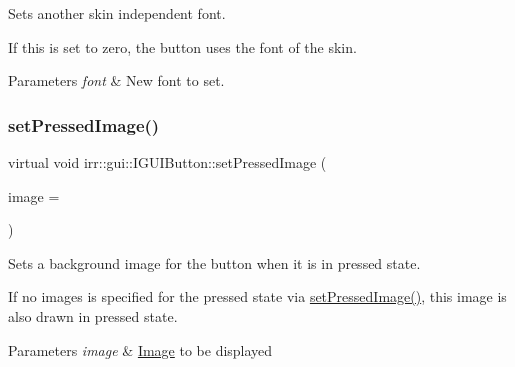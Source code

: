 Sets another skin independent font. 

If this is set to zero, the button uses the font of the skin. 
\begin{DoxyParams}{Parameters}
{\em font} & New font to set. \\
\hline
\end{DoxyParams}
\mbox{\label{classirr_1_1gui_1_1IGUIButton_a10389917530aa2f4a3008330c0695aad}} 
\subsubsection{\texorpdfstring{set\+Pressed\+Image()}{setPressedImage()}\hspace{0.1cm}{\footnotesize\ttfamily [1/2]}}
{\footnotesize\ttfamily virtual void irr\+::gui\+::\+I\+G\+U\+I\+Button\+::set\+Pressed\+Image (\begin{DoxyParamCaption}\item[{\hyperlink{classirr_1_1video_1_1ITexture}{video\+::\+I\+Texture} $\ast$}]{image = {} }\end{DoxyParamCaption})\hspace{0.3cm}{\ttfamily [pure virtual]}}



Sets a background image for the button when it is in pressed state. 

If no images is specified for the pressed state via \hyperlink{classirr_1_1gui_1_1IGUIButton_a10389917530aa2f4a3008330c0695aad}{set\+Pressed\+Image()}, this image is also drawn in pressed state. 
\begin{DoxyParams}{Parameters}
{\em image} & \hyperlink{classImage}{Image} to be displayed \\
\hline
\end{DoxyParams}
\mbox{\label{classirr_1_1gui_1_1IGUIButton_a08019647ec3e08984d795b3c564d457e}} 
